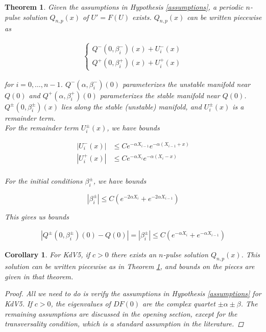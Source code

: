 \documentclass[12pt]{article}
\newtheorem{theorem}{Theorem}
\newtheorem{corollary}{Corollary}
\begin{document}
\begin{theorem}\label{2pconstruction}
Given the assumptions in Hypothesis \ref{assumptions}, a periodic $n$-pulse solution $Q_{n,p}(x)$ of $U' = F(U)$ exists. $Q_{n, p}(x)$ can be written piecewise as

\begin{align*}
\begin{cases}
Q^-(0, \beta_i^-)(x) + U_i^-(x) \\
Q^+(0, \beta_i^+)(x) + U_i^+(x)
\end{cases}
\end{align*}

for $i = 0, \dots, n-1$. $Q^-(\alpha, \beta_i^-)(0)$ parameterizes the unstable manifold near $Q(0)$ and $Q^+(\alpha, \beta_i^+)(0)$ parameterizes the stable manifold near $Q(0)$. $Q^\pm(0, \beta_i^\pm)(x)$ lies along the stable (unstable) manifold, and $U_i^\pm(x)$ is a remainder term.\\

For the remainder term $U_i^\pm(x)$, we have bounds

\begin{align*}
|U_i^-(x)| &\leq C e^{-\alpha X_{i-1}} e^{-\alpha(X_{i-1} + x)} \\
|U_i^+(x)| &\leq C e^{-\alpha X_i} e^{-\alpha(X_i - x)} \\
\end{align*}

For the initial conditions $\beta_i^\pm$, we have bounds

\begin{equation}
| \beta_i^\pm | \leq C (e^{-2 \alpha X_i} + e^{-2 \alpha X_{i-1}})
\end{equation}

This gives us bounds

\begin{align*}
|Q^\pm(0, \beta_i^\pm)(0) - Q(0)| = |\beta_i^\pm| \leq 
C \left( e^{-\alpha X_i} + e^{-\alpha X_{i-1}} \right)
\end{align*}

\end{theorem}


\begin{corollary}
For KdV5, if $c > 0$ there exists an $n$-pulse solution $Q_{n, p}(x)$. This solution can be written piecewise as in Theorem \ref{2pconstruction}, and bounds on the pieces are given in that theorem.

\begin{proof}
All we need to do is verify the assumptions in Hypothesis \ref{assumptions} for KdV5. If $c > 0$, the eigenvalues of $DF(0)$ are the complex quartet $\pm \alpha \pm \beta$. The remaining assumptions are discussed in the opening section, except for the transversality condition, which is a standard assumption in the literature.
\end{proof}

\end{corollary}
\end{document}
